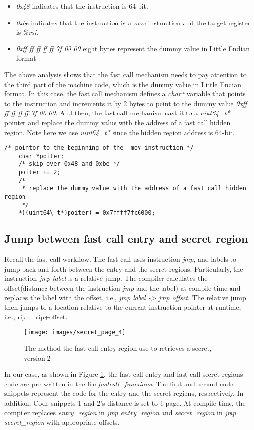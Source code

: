   \begin{itemize}
    \item \emph{0x48} indicates that the instruction is 64-bit.
    \item \emph{0xbe} indicates that the instruction is a \emph{mov} instruction and the target register is \emph{\%rsi}.
    \item \emph{0xff ff ff ff ff 7f 00 00 } eight bytes represent the dummy value in Little Endian format
  \end{itemize}
  
  The above analysis shows that the fast call mechanism needs to pay attention to 
  the third part of the machine code, which is the dummy value in Little Endian 
  format\cite{15}. In this case, the fast call mechanism defines a \emph{char*} variable that 
  points to the instruction and increments it by 2 bytes to point to the 
  dummy value \emph{0xff ff ff ff ff 7f 00 00}. And then, the fast call mechanism cast it to a \emph{uint64\_t*}
  pointer and replace the dummy value with the address of a fast call hidden 
  region. Note here we use \emph{uint64\_t*} since the hidden region address is 64-bit.

  \begin{lstlisting}[style=CStyle]
    /* pointor to the beginning of the  mov instruction */ 
    char *poiter;
    /* skip over 0x48 and 0xbe */ 
    poiter += 2; 
    /* 
     * replace the dummy value with the address of a fast call hidden region 
     */  
    *((uint64\_t*)poiter) = 0x7ffff7fc6000; 
  \end{lstlisting}


\subsection{Jump between fast call entry and secret region}

Recall the fast call workflow. The fast call uses instruction \emph{jmp}, 
and labels to jump back and forth between the entry and the secret regions. 
Particularly, the instruction \emph{jmp label} is a relative jump\cite{14}. 
The compiler calculates the offset(distance between the instruction \emph{jmp}
and the label) at compile-time and replaces the label with the offset, i.e., 
\emph{jmp label -> jmp offset}. The relative jump then jumps to a location relative to the current 
instruction pointer at runtime, i.e., rip = rip+offset.
\begin{figure}[H]
  \centering
  \texttt{[image: images/secret\_page\_4]}
  \caption[Short description]{The method the fast call entry region use to retrieves a 
  secret, version 2}
   \label{fig:secret_page_4}
\end{figure}
In our case, as shown in Figure \ref{fig:secret_page_4},  the fast call entry and fast call 
secret regions code are pre-written in the file \emph{fastcall\_functions}. 
The first and second code snippets represent the code for the entry and 
the secret regions, respectively. In addition,  Code snippets 1 and 2's 
distance is set to 1 page.  At compile time, the compiler replaces
\emph{entry\_region} in \emph{jmp entry\_region} and \emph{secret\_region} in \emph{jmp secret\_region}  
with appropriate offsets.  



